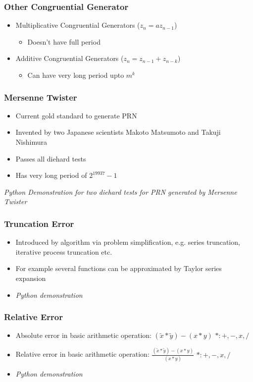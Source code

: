 \documentclass{beamer}
\begin{document}
\begin{frame}
\frametitle{Other Congruential Generator}

\begin{itemize}
\item Multiplicative Congruential Generators ($z_n = az_{n-1}$)
\begin{itemize}
\item Doesn't have full period
\end{itemize}
\item Additive Congruential Generators ($z_n = z_{n-1} + z_{n-k}$)
\begin{itemize}
\item Can have very long period upto $m^k$
\end{itemize}

\end{itemize}

\end{frame}



\begin{frame}
\frametitle{Mersenne Twister}

\begin{itemize}
\item Current gold standard to generate PRN
\item Invented by two Japanese scientists Makoto Matsumoto and Takuji Nishimura
\item Passes all diehard tests 
\item Has very long period of $2^{19937} - 1$

\end{itemize}
\textit{Python Demonstration for two diehard tests for PRN generated by Mersenne Twister}
\end{frame}





\begin{frame}
\frametitle{Truncation Error}

\begin{itemize}
\item Introduced by algorithm via problem simplification, e.g. series truncation, iterative process truncation etc.
\item For example several functions can be approximated by Taylor series expansion
\item \textit{Python demonstration}
\end{itemize}

\end{frame}


\begin{frame}
\frametitle{Relative Error}

\begin{itemize}
\item Absolute error in basic arithmetic operation: $(\tilde{x} * \tilde{y}) - (x * y)$  $*:{+, -, x, /}$
\item Relative error in basic arithmetic operation: $\frac{(\tilde{x} * \tilde{y}) - (x * y)}{(x * y)}$  $*:{+, -, x, /}$
\item \textit{Python demonstration}
\end{itemize}

\end{frame}
\end{document}
